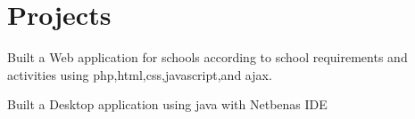 \documentclass[letterpaper]{deedy-resume} %
\begin{document}
\begin{minipage}[t]{0.66\textwidth}
\sectionspace %




\sectionspace %


\section{Projects} 

\begin{tightitemize}
\item Built  a Web application for schools according to school requirements and activities using php,html,css,javascript,and ajax.

\end{tightitemize}
\sectionspace %


\begin{tightitemize}
\item Built a Desktop application using java with Netbenas IDE   

\end{tightitemize}


\end{minipage}
\end{document}
